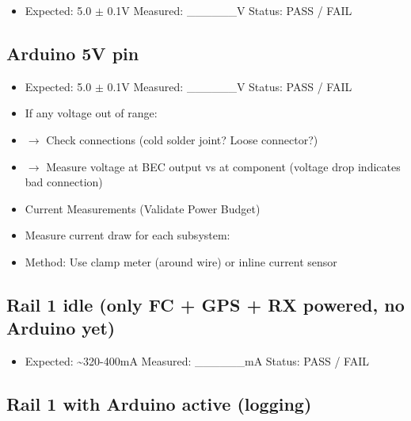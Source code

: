 \documentclass[11pt,letterpaper]{article}
\begin{document}
\begin{itemize}
  \item Expected: 5.0 $\pm$ 0.1V    Measured: \_\_\_\_\_\_V    Status: PASS / FAIL
\end{itemize}

\subsection{Arduino 5V pin}

\begin{itemize}
  \item Expected: 5.0 $\pm$ 0.1V    Measured: \_\_\_\_\_\_V    Status: PASS / FAIL
\end{itemize}

\begin{itemize}
  \item If any voltage out of range:
  \item $\rightarrow$ Check connections (cold solder joint? Loose connector?)
  \item $\rightarrow$ Measure voltage at BEC output vs at component (voltage drop indicates bad connection)
\end{itemize}

\begin{itemize}
  \item Current Measurements (Validate Power Budget)
  \item Measure current draw for each subsystem:
\end{itemize}

\begin{itemize}
  \item Method: Use clamp meter (around wire) or inline current sensor
\end{itemize}

\subsection{Rail 1 idle (only FC + GPS + RX powered, no Arduino yet)}

\begin{itemize}
  \item Expected: \textasciitilde{}320-400mA    Measured: \_\_\_\_\_\_mA    Status: PASS / FAIL
\end{itemize}

\subsection{Rail 1 with Arduino active (logging)}
\end{document}

